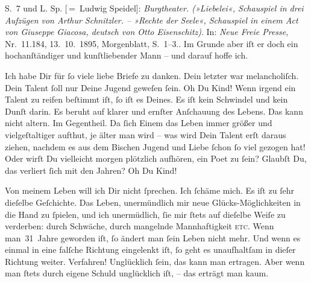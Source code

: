 {{{                     S. 7 und L. Sp. [ = Ludwig Speidel]: \emph{Burgtheater. (»Liebelei«, Schauspiel in drei Aufzügen von
                        Arthur Schnitzler. – »Rechte der Seele«, Schauspiel in einem Act von
                        Giuseppe Giacosa, deutsch von Otto Eisenschitz)}. In: \emph{Neue Freie Presse}, Nr. 11.184, 13. 10. 1895, Morgenblatt, S. 1–3.}}}\label{K_L02762-8}. Im Grunde {\pb}aber iſt er doch ein hochanſtändiger und
               kunſtliebender Mann – und darauf hoffe ich.\pend
           
\pstart
           Ich habe Dir für{ }ſo viele liebe Briefe zu danken. Dein letzter war melancholiſch.
               Dein Talent{ }ſoll nur Deine Jugend geweſen{ }ſein. Oh Du Kind! Wenn irgend ein Talent zu
               reifen beſtimmt iſt,{ }ſo iſt es Deines. Es iſt kein Schwindel und kein Dunſt darin. Es
               beruht auf klarer {\pb}und  ernſter Anſchauung des Lebens.  Das
               kann nicht altern. Im Gegentheil. Da{ }ſich Einem das Leben immer größer und
               vielgeſtaltiger aufthut, je älter man wird – was wird Dein Talent erſt daraus ziehen,
                   nachdem es aus dem Bischen Jugend und Liebe{ }ſchon{ }ſo viel gezogen hat! Oder wirſt Du vielleicht morgen plötzlich {\pb}aufhören, ein Poet zu{ }ſein? Glaubſt Du, das verliert{ }ſich mit den Jahren? Oh Du Kind! {\dotsfive}\pend
           
\pstart
           Von meinem Leben will ich Dir nicht{ }ſprechen. Ich{ }ſchäme mich. Es iſt zu{ }ſehr
               dieſelbe Geſchichte. Das Leben, unermündlich mir 
               neue Glücks-Möglichkeiten in die Hand zu{ }ſpielen, und {\pb}ich unermüdlich,{ }ſie mir{ }ſtets auf dieſelbe Weiſe zu
               verderben: durch Schwäche, durch mangelnde Mannhaftigkeit \textsc{etc}. Wenn man 31 Jahre geworden iſt,{ }ſo ändert man{ }ſein Leben nicht mehr.
               Und wenn es einmal in eine falſche Richtung eingelenkt iſt,{ }ſo geht es unaufhaltſam
               in dieſer Richtung weiter. Verfahren! Unglücklich{ }ſein, das kann man {\pb}ertragen. Aber wenn man{ }ſtets durch eigene Schuld
               unglücklich iſt, – das erträgt man kaum.\pend
           

